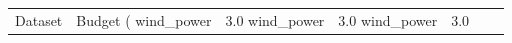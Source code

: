 \begin{tabular}{llrlrrr}
\toprule
Dataset & Budget (%
\midrule
wind_power & 3.0%
wind_power & 3.0%
wind_power & 3.0%
\bottomrule
\end{tabular}
